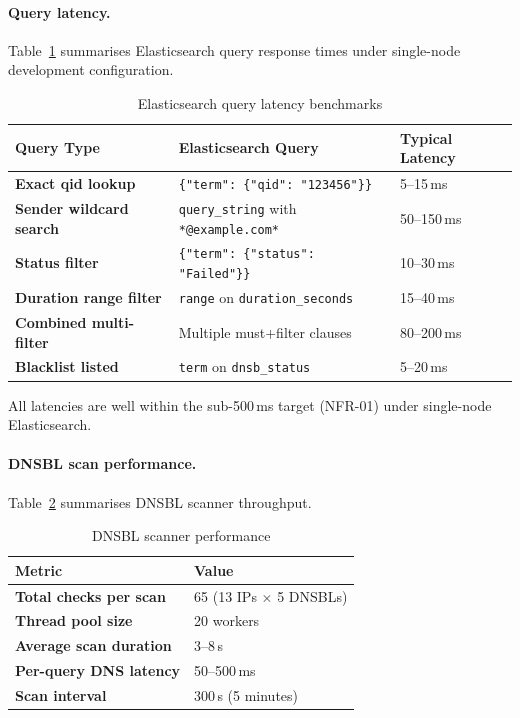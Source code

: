 \documentclass[12pt,a4paper,oneside]{report}
\newcommand{\rowA}{\rowcolor{rowgray}}
\begin{document}
\paragraph{Query latency.}
Table~\ref{tab:bench-query} summarises Elasticsearch query response times under single-node development configuration.

\begin{table}[H]
\centering
\caption{Elasticsearch query latency benchmarks}
\label{tab:bench-query}
\begin{tabularx}{\textwidth}{@{}>{\bfseries}p{4cm} X p{3cm}@{}}
\toprule
Query Type & Elasticsearch Query & Typical Latency \\
\midrule
\rowA Exact qid lookup & \texttt{\{"term": \{"qid": "123456"\}\}} & 5--15\,ms \\
Sender wildcard search & \texttt{query\_string} with \texttt{*@example.com*} & 50--150\,ms \\
\rowA Status filter & \texttt{\{"term": \{"status": "Failed"\}\}} & 10--30\,ms \\
Duration range filter & \texttt{range} on \texttt{duration\_seconds} & 15--40\,ms \\
\rowA Combined multi-filter & Multiple must+filter clauses & 80--200\,ms \\
Blacklist listed & \texttt{term} on \texttt{dnsb\_status} & 5--20\,ms \\
\bottomrule
\end{tabularx}
\end{table}

All latencies are well within the sub-500\,ms target (NFR-01) under single-node Elasticsearch.

\paragraph{DNSBL scan performance.}
Table~\ref{tab:bench-dnsbl} summarises DNSBL scanner throughput.

\begin{table}[H]
\centering
\caption{DNSBL scanner performance}
\label{tab:bench-dnsbl}
\begin{tabular}{@{}>{\bfseries}p{5cm} p{4cm}@{}}
\toprule
Metric & Value \\
\midrule
\rowA Total checks per scan & 65 (13 IPs $\times$ 5 DNSBLs) \\
Thread pool size & 20 workers \\
\rowA Average scan duration & 3--8\,s \\
Per-query DNS latency & 50--500\,ms \\
\rowA Scan interval & 300\,s (5 minutes) \\
\bottomrule
\end{tabular}
\end{table}
\end{document}
